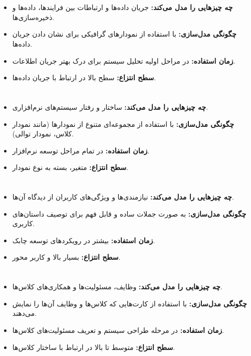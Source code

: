 \section*{}
\begin{itemize}
	\item \textbf{چه چیزهایی را مدل می‌کند:} جریان داده‌ها و ارتباطات بین فرایندها، داده‌ها و ذخیره‌سازی‌ها.
	\item \textbf{چگونگی مدل‌سازی:} با استفاده از نمودارهای گرافیکی برای نشان دادن جریان داده‌ها.
	\item \textbf{زمان استفاده:} در مراحل اولیه تحلیل سیستم برای درک بهتر جریان اطلاعات.
	\item \textbf{سطح انتزاع:} سطح بالا در ارتباط با جریان داده‌ها.
\end{itemize}

\section*{}
\begin{itemize}
	\item \textbf{چه چیزهایی را مدل می‌کند:} ساختار و رفتار سیستم‌های نرم‌افزاری.
	\item \textbf{چگونگی مدل‌سازی:} با استفاده از مجموعه‌ای متنوع از نمودارها (مانند نمودار کلاس، نمودار توالی).
	\item \textbf{زمان استفاده:} در تمام مراحل توسعه نرم‌افزار.
	\item \textbf{سطح انتزاع:} متغیر، بسته به نوع نمودار.
\end{itemize}

\section*{}
\begin{itemize}
	\item \textbf{چه چیزهایی را مدل می‌کند:} نیازمندی‌ها و ویژگی‌های کاربران از دیدگاه آن‌ها.
	\item \textbf{چگونگی مدل‌سازی:} به صورت جملات ساده و قابل فهم برای توصیف داستان‌های کاربری.
	\item \textbf{زمان استفاده:} بیشتر در رویکردهای توسعه چابک.
	\item \textbf{سطح انتزاع:} بسیار بالا و کاربر محور.
\end{itemize}

\section*{}
\begin{itemize}
	\item \textbf{چه چیزهایی را مدل می‌کند:} وظایف، مسئولیت‌ها و همکاری‌های کلاس‌ها.
	\item \textbf{چگونگی مدل‌سازی:} با استفاده از کارت‌هایی که کلاس‌ها و وظایف آن‌ها را نمایش می‌دهند.
	\item \textbf{زمان استفاده:} در مرحله طراحی سیستم و تعریف مسئولیت‌های کلاس‌ها.
	\item \textbf{سطح انتزاع:} متوسط تا بالا در ارتباط با ساختار کلاس‌ها.
\end{itemize}

